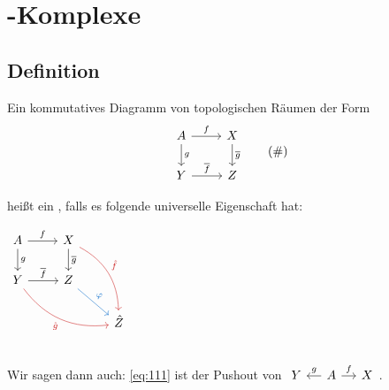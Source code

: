 \section{\CW-Komplexe} %
\label{sec:11}

\subsection[Definition: Pushout]{Definition} %
\label{sub:111}
Ein kommutatives Diagramm von topologischen Räumen der Form
\begin{equation*}
	\begin{tikzcd}
		A \rar["f"] \dar["g"] & X \dar["\overline{g} "] \\
		Y \rar["\overline{f}"] & Z
	\end{tikzcd} \label{eq:111} \tag{\#}
\end{equation*}
\noindent\begin{minipage}{0.65\textwidth}
	heißt ein , falls es folgende universelle Eigenschaft hat: \smallskip\\
\end{minipage}
\hfill \begin{minipage}{0.3\textwidth}
	\(
		\begin{tikzcd}
			A \rar["f"] \dar["g"] & X \dar["\overline{g}"] \arrow[ddr, "\hat{f}", bend left, Firebrick3] \\
			Y \rar["\overline{f}"] \arrow[drr, "\hat{g}"',bend right, Firebrick3] & Z  \drar["\varphi", DodgerBlue3] \\
			& & \hat{Z}
		\end{tikzcd}
	\)
\end{minipage}\\
Wir sagen dann auch: \eqref{eq:111} ist der Pushout von 
\(
	\begin{tikzcd}[sep=small]
		Y & A \rar["f"] \lar["g"']& X 
	\end{tikzcd}
\).
